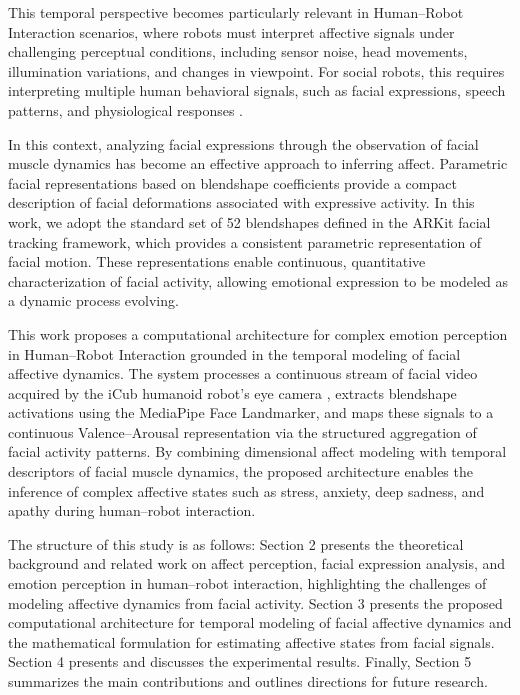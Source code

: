 \documentclass[letterpaper, 10 pt, conference]{ieeeconf}  %
\begin{document}
This temporal perspective becomes particularly relevant in Human–Robot Interaction scenarios, where robots must interpret affective signals under challenging perceptual conditions, including sensor noise, head movements, illumination variations, and changes in viewpoint. For social robots, this requires interpreting multiple human behavioral signals, such as facial expressions, speech patterns, and physiological responses \cite{Gunes2023AffectiveHRI}.

In this context, analyzing facial expressions through the observation of facial muscle dynamics has become an effective approach to inferring affect. Parametric facial representations based on blendshape coefficients provide a compact description of facial deformations associated with expressive activity. In this work, we adopt the standard set of 52 blendshapes defined in the ARKit facial tracking framework, which provides a consistent parametric representation of facial motion. These representations enable continuous, quantitative characterization of facial activity, allowing emotional expression to be modeled as a dynamic process evolving.

This work proposes a computational architecture for complex emotion perception in Human–Robot Interaction grounded in the temporal modeling of facial affective dynamics. The system processes a continuous stream of facial video acquired by the iCub humanoid robot's eye camera \cite{Metta2010iCub}, extracts blendshape activations using the MediaPipe Face Landmarker, and maps these signals to a continuous Valence–Arousal representation via the structured aggregation of facial activity patterns. By combining dimensional affect modeling with temporal descriptors of facial muscle dynamics, the proposed architecture enables the inference of complex affective states such as stress, anxiety, deep sadness, and apathy during human–robot interaction.

The structure of this study is as follows: Section 2 presents the theoretical background and related work on affect perception, facial expression analysis, and emotion perception in human–robot interaction, highlighting the challenges of modeling affective dynamics from facial activity. Section 3 presents the proposed computational architecture for temporal modeling of facial affective dynamics and the mathematical formulation for estimating affective states from facial signals. Section 4 presents and discusses the experimental results. Finally, Section 5 summarizes the main contributions and outlines directions for future research.
\end{document}
